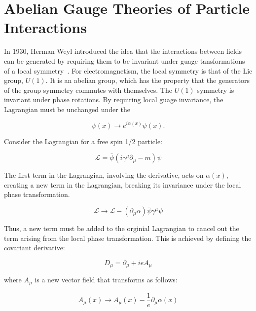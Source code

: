 \section{Abelian Gauge Theories of Particle Interactions}
\label{abelian_gauge_theory_overview}

\par In 1930, Herman Weyl introduced the idea that the interactions
between fields can be generated by requiring them to be invariant
under guage tansformations of a local symmetry~\cite{Weyl}.  For
electromagnetism, the local symmetry is that of the Lie group,
$U(1)$.  It is an abelian group, which has the property that the
generators of the group symmetry commutes with themselves. 
The $U(1)$ symmetry is invariant under phase rotations.  By requiring
local guage invariance, the Lagrangian must be unchanged under the 

\begin{equation}\label{eq:u1_psi_transformation}
\psi(x) \rightarrow e^{i\alpha(x)}\psi(x).
\end{equation}

Consider the Lagrangian for a free spin 1/2 particle: 

\begin{equation}\label{eq:dirac_lagrangian}
\mathcal{L} = \bar{\psi}(i\gamma^{\mu}\partial_{\mu} - m)\psi
\end{equation}

\noindent The first term in the Lagrangian, involving the derivative,
acts on $\alpha(x)$, creating a new term in the Lagrangian, breaking
its invariance under the local phase transformation.  

\begin{equation}\label{eq:u1_lagrangian_transformation}
\mathcal{L}\rightarrow\mathcal{L} -
(\partial_{\mu}\alpha)\bar{\psi}\gamma^{\mu}\psi
\end{equation}

\noindent Thus, a new term must be added to the orginial Lagrangian to cancel
out the term arising from the local phase transformation.  This is
achieved by defining the covariant derivative:

\begin{equation}\label{eq:covariant_derivative_em}
D_{\mu} = \partial_{\mu} + ieA_{\mu}
\end{equation} 

\noindent where $A_{\mu}$ is a new vector field that transforms as follows:

\begin{equation}\label{eq:u1_Afield_transformation}
A_{\mu}(x) \rightarrow A_{\mu}(x) - \frac{1}{e}\partial_{\mu}\alpha(x)
\end{equation}

